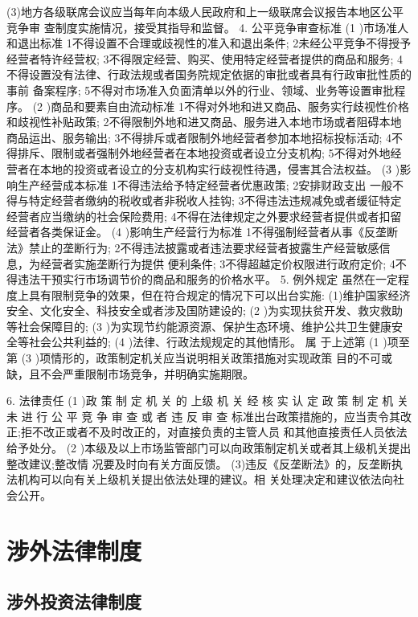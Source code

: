 \documentclass[UTF8,12pt]{ctexart}
\numberwithin{equation}{section} %
\numberwithin{figure}{section}
\numberwithin{table}{section}
\begin{document}
	(3)地方各级联席会议应当每年向本级人民政府和上一级联席会议报告本地区公平竞争审 查制度实施情况，接受其指导和监督。
	4. 公平竞争审查标准
	(1 )市场准人和退出标准
	1不得设置不合理或歧视性的准入和退出条件; 2未经公平竞争不得授予经营者特许经营权; 3不得限定经营、购买、使用特定经营者提供的商品和服务; 4不得设置没有法律、行政法规或者国务院规定依据的审批或者具有行政审批性质的事前 备案程序;
	5不得对市场准入负面清单以外的行业、领域、业务等设置审批程序。
	(2 )商品和要素自由流动标准 1不得对外地和进又商品、服务实行歧视性价格和歧视性补贴政策; 2不得限制外地和进又商品、服务进入本地市场或者阻碍本地商品运出、服务输出; 3不得排斥或者限制外地经营者参加本地招标投标活动; 4不得排斥、限制或者强制外地经营者在本地投资或者设立分支机构; 5不得对外地经营者在本地的投资或者设立的分支机构实行歧视性待遇，侵害其合法权益。 (3 )影响生产经营成本标准
	1不得违法给予特定经营者优惠政策;
	2安排财政支出 一般不得与特定经营者缴纳的税收或者非税收人挂钩; 3不得违法违规减免或者缓征特定经营者应当缴纳的社会保险费用; 4不得在法律规定之外要求经营者提供或者扣留经营者各类保证金。 (4 )影响生产经营行为标准
	1不得强制经营者从事《反垄断法》禁止的垄断行为; 2不得违法披露或者违法要求经营者披露生产经营敏感信息，为经营者实施垄断行为提供 便利条件;
	3不得超越定价权限进行政府定价; 4不得违法干预实行市场调节价的商品和服务的价格水平。
	5. 例外规定 虽然在一定程度上具有限制竞争的效果，但在符合规定的情况下可以出台实施: (1)维护国家经济安全、文化安全、科技安全或者涉及国防建设的;
	(2 )为实现扶贫开发、救灾救助等社会保障目的;
	(3 )为实现节约能源资源、保护生态环境、维护公共卫生健康安全等社会公共利益的; (4 )法律、行政法规规定的其他情形。
	属 于上述第 (1 )项至第 (3 )项情形的，政策制定机关应当说明相关政策措施对实现政策 目的不可或缺，且不会严重限制市场竞争，并明确实施期限。
	
	6. 法律责任
	(1 )政 策 制 定 机 关 的 上级 机 关 经 核 实 认 定 政 策 制 定 机 关 未 进 行 公 平 竞 争 审 查 或 者 违 反 审 查 标准出台政策措施的，应当责令其改正;拒不改正或者不及时改正的，对直接负责的主管人员 和其他直接责任人员依法给予处分。
	(2 )本级及以上市场监管部门可以向政策制定机关或者其上级机关提出整改建议;整改情 况要及时向有关方面反馈。 (3)违反《反垄断法》的，反垄断执法机构可以向有关上级机关提出依法处理的建议。相 关处理决定和建议依法向社会公开。
	
	\newpage
	\section{涉外法律制度}
	
	\subsection{涉外投资法律制度}
\end{document}
